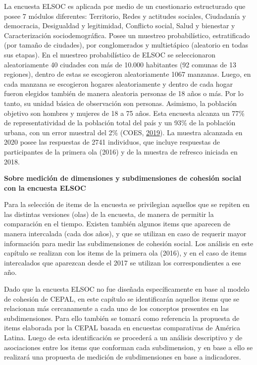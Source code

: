 \documentclass[
  12pt,
]{book}
\begin{document}
La encuesta ELSOC es aplicada por medio de un cuestionario estructurado que posee 7 módulos diferentes: Territorio, Redes y actitudes sociales, Ciudadanía y democracia, Desigualdad y legitimidad, Conflicto social, Salud y bienestar y Caracterización sociodemográfica. Posee un muestreo probabilístico, estratificado (por tamaño de ciudades), por conglomerados y multietápico (aleatorio en todas sus etapas). En el muestreo probabilístico de ELSOC se seleccionaron aleatoriamente 40 ciudades con más de 10.000 habitantes (92 comunas de 13 regiones), dentro de estas se escogieron aleatoriamente 1067 manzanas. Luego, en cada manzana se escogieron hogares aleatoriamente y dentro de cada hogar fueron elegidos también de manera aleatoria personas de 18 años o más. Por lo tanto, su unidad básica de observación son personas. Asimismo, la población objetivo son hombres y mujeres de 18 a 75 años. Esta encuesta alcanza un 77\% de representatividad de la población total del país y un 93\% de la población urbana, con un error muestral del 2\% (COES, \protect\hyperlink{ref-coes_radiografia_2019}{2019}). La muestra alcanzada en 2020 posee las respuestas de 2741 individuos, que incluye respuestas de participantes de la primera ola (2016) y de la muestra de refresco iniciada en 2018.

\textbf{Sobre medición de dimensiones y subdimensiones de cohesión social con la encuesta ELSOC}

Para la selección de items de la encuesta se privilegian aquellos que se repiten en las distintas versiones (olas) de la encuesta, de manera de permitir la comparación en el tiempo. Existen también algunos items que aparecen de manera intercalada (cada dos años), y que se utilizan en caso de requerir mayor información para medir las subdimensiones de cohesión social. Los análisis en este capítulo se realizan con los items de la primera ola (2016), y en el caso de items intercalados que aparezcan desde el 2017 se utilizan los correspondientes a ese año.

Dado que la encuesta ELSOC no fue diseñada específicamente en base al modelo de cohesión de CEPAL, en este capítulo se identificarán aquellos items que se relacionan más cercanamente a cada uno de los conceptos presentes en las subdimensiones. Para ello también se tomará como referencia la propuesta de items elaborada por la CEPAL basada en encuestas comparativas de América Latina. Luego de esta identificación se procederá a un análisis descriptivo y de asociaciones entre los items que conforman cada subdimension, y en base a ello se realizará una propuesta de medición de subdimensiones en base a indicadores.
\end{document}
